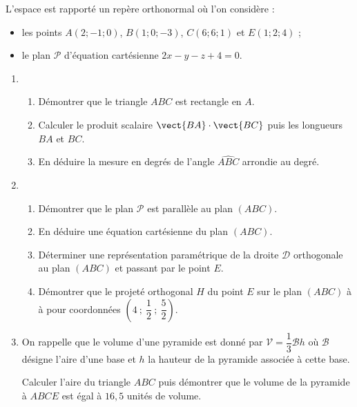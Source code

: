 L'espace est rapporté un repère orthonormal où l'on considère :
%
\begin{itemize}
	\item les points $A(2;-1;0)$, $B(1;0;-3)$, $C(6;6;1)$ et $E(1;2;4)$ ;
	\item le plan $\mathcal{P}$ d'équation cartésienne $2x - y - z + 4 = 0$.
\end{itemize}

\begin{enumerate}
	\item
	\begin{enumerate}
		\item Démontrer que le triangle $ABC$ est rectangle en $A$.
		\item Calculer le produit scalaire $\vect{BA} \cdot \vect{BC}$ puis les longueurs $BA$ et $BC$.
		\item En déduire la mesure en degrés de l'angle $\widehat{ABC}$ arrondie au degré.
	\end{enumerate}
	\item
	\begin{enumerate}
		\item Démontrer que le plan $\mathcal{P}$ est parallèle au plan $(ABC)$.
		\item En déduire une équation cartésienne du plan $(ABC)$.
		\item Déterminer une représentation paramétrique de la droite $\mathcal{D}$ orthogonale au plan $(ABC)$ et passant par le point $E$.
		\item Démontrer que le projeté orthogonal $H$ du point $E$ sur le plan $(ABC)$ à à pour coordonnées $\left(4~;~\dfrac{1}{2}~;~\dfrac{5}{2}\right)$.
	\end{enumerate}
	\item On rappelle que le volume d'une pyramide est donné par $\mathcal{V} = \dfrac13 \mathcal{B}h$ où $\mathcal{B}$ désigne l'aire d'une base et $h$ la hauteur de la pyramide associée à cette base.
	
	Calculer l'aire du triangle $ABC$ puis démontrer que le volume de la pyramide à $ABCE$ est égal à $16,5$ unités de volume.
\end{enumerate}